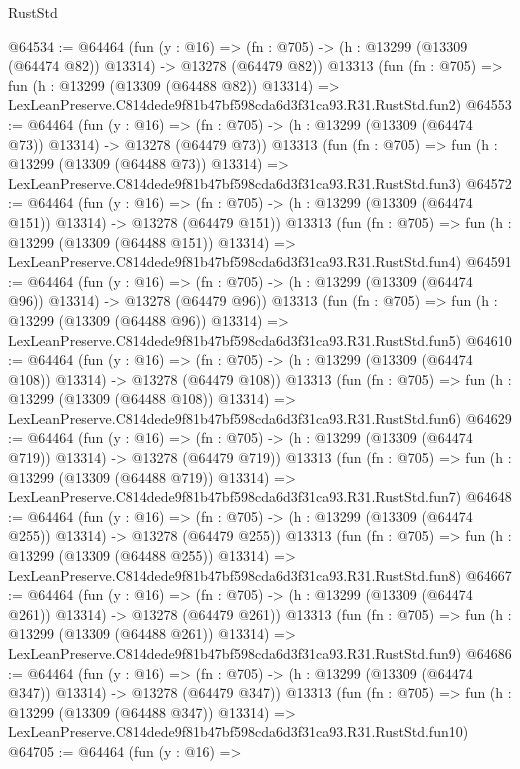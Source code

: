 \begin{lexlean}{RustStd}
\begin{coremodule}
@64534 := @64464
    (fun (y : @16) =>
    (fn : @705) -> (h : @13299 (@13309 (@64474 @82)) @13314) -> @13278 (@64479 @82))
    @13313
    (fun (fn : @705) =>
    fun (h : @13299 (@13309 (@64488 @82)) @13314) =>
    LexLeanPreserve.C814dede9f81b47bf598cda6d3f31ca93.R31.RustStd.fun2)
@64553 := @64464
    (fun (y : @16) =>
    (fn : @705) -> (h : @13299 (@13309 (@64474 @73)) @13314) -> @13278 (@64479 @73))
    @13313
    (fun (fn : @705) =>
    fun (h : @13299 (@13309 (@64488 @73)) @13314) =>
    LexLeanPreserve.C814dede9f81b47bf598cda6d3f31ca93.R31.RustStd.fun3)
@64572 := @64464
    (fun (y : @16) =>
    (fn : @705) -> (h : @13299 (@13309 (@64474 @151)) @13314) -> @13278 (@64479 @151))
    @13313
    (fun (fn : @705) =>
    fun (h : @13299 (@13309 (@64488 @151)) @13314) =>
    LexLeanPreserve.C814dede9f81b47bf598cda6d3f31ca93.R31.RustStd.fun4)
@64591 := @64464
    (fun (y : @16) =>
    (fn : @705) -> (h : @13299 (@13309 (@64474 @96)) @13314) -> @13278 (@64479 @96))
    @13313
    (fun (fn : @705) =>
    fun (h : @13299 (@13309 (@64488 @96)) @13314) =>
    LexLeanPreserve.C814dede9f81b47bf598cda6d3f31ca93.R31.RustStd.fun5)
@64610 := @64464
    (fun (y : @16) =>
    (fn : @705) -> (h : @13299 (@13309 (@64474 @108)) @13314) -> @13278 (@64479 @108))
    @13313
    (fun (fn : @705) =>
    fun (h : @13299 (@13309 (@64488 @108)) @13314) =>
    LexLeanPreserve.C814dede9f81b47bf598cda6d3f31ca93.R31.RustStd.fun6)
@64629 := @64464
    (fun (y : @16) =>
    (fn : @705) -> (h : @13299 (@13309 (@64474 @719)) @13314) -> @13278 (@64479 @719))
    @13313
    (fun (fn : @705) =>
    fun (h : @13299 (@13309 (@64488 @719)) @13314) =>
    LexLeanPreserve.C814dede9f81b47bf598cda6d3f31ca93.R31.RustStd.fun7)
@64648 := @64464
    (fun (y : @16) =>
    (fn : @705) -> (h : @13299 (@13309 (@64474 @255)) @13314) -> @13278 (@64479 @255))
    @13313
    (fun (fn : @705) =>
    fun (h : @13299 (@13309 (@64488 @255)) @13314) =>
    LexLeanPreserve.C814dede9f81b47bf598cda6d3f31ca93.R31.RustStd.fun8)
@64667 := @64464
    (fun (y : @16) =>
    (fn : @705) -> (h : @13299 (@13309 (@64474 @261)) @13314) -> @13278 (@64479 @261))
    @13313
    (fun (fn : @705) =>
    fun (h : @13299 (@13309 (@64488 @261)) @13314) =>
    LexLeanPreserve.C814dede9f81b47bf598cda6d3f31ca93.R31.RustStd.fun9)
@64686 := @64464
    (fun (y : @16) =>
    (fn : @705) -> (h : @13299 (@13309 (@64474 @347)) @13314) -> @13278 (@64479 @347))
    @13313
    (fun (fn : @705) =>
    fun (h : @13299 (@13309 (@64488 @347)) @13314) =>
    LexLeanPreserve.C814dede9f81b47bf598cda6d3f31ca93.R31.RustStd.fun10)
@64705 := @64464
    (fun (y : @16) =>

\end{coremodule}
\end{lexlean}
